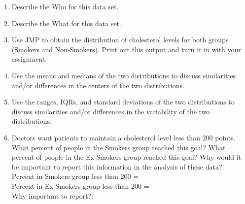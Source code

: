 \documentclass{article}
\begin{document}
\begin{enumerate}
\begin{enumerate}
\item Describe the Who for this data set.\\[0.5in]
\item Describe the What for this data set.\\[0.5in]
\item Use JMP to obtain the distribution of cholesterol levels for both groups (Smokers and Non-Smokers).  Print out this output and turn it in with your assignment.\\[1em]
\item Use the means and medians of the two distributions to discuss similarities and/or differences in the centers of the two distributions.\\[1in]
\item Use the ranges, IQRs, and standard deviations of the two distributions to discuss similarities and/or differences in the variability of the two distributions.\\[1in]
\item Doctors want patients to maintain a cholesterol level less than 200 points.  What percent of people in the Smokers group reached this goal?  What percent of people in the Ex-Smokers group reached this goal?  Why would it be important to report this information in the analysis of these data?\\[0.5em]

Percent in Smokers group less than 200 = \underline{\mbox{\hspace{1.5in}}}\\[1.5em]
Percent in Ex-Smokers group less than 200 = \underline{\mbox{\hspace{1.5in}}}\\[1em]

Why important to report?:
\end{enumerate}

\end{enumerate}
\end{document}
